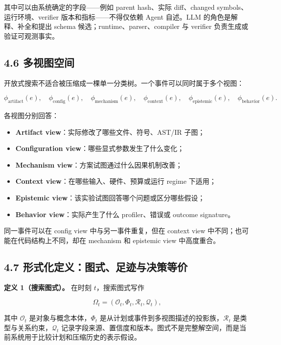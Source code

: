 \documentclass[
  11pt]{ctexart}
\providecommand{\tightlist}{%
  \setlength{\itemsep}{0pt}\setlength{\parskip}{0pt}}
\begin{document}
其中可以由系统确定的字段------例如 parent hash、实际 diff、changed
symbols、运行环境、verifier 版本和指标------不得仅依赖 Agent 自述。LLM
的角色是解释、补全和提出 schema 候选；runtime、parser、compiler 与
verifier 负责生成或验证可观测事实。

\subsection{4.6 多视图空间}\label{ux591aux89c6ux56feux7a7aux95f4}

开放式搜索不适合被压缩成一棵单一分类树。一个事件可以同时属于多个视图：

\[
\phi_{\text{artifact}}(e),\quad
\phi_{\text{config}}(e),\quad
\phi_{\text{mechanism}}(e),\quad
\phi_{\text{context}}(e),\quad
\phi_{\text{epistemic}}(e),\quad
\phi_{\text{behavior}}(e).
\]

各视图分别回答：

\begin{itemize}
\tightlist
\item
  \textbf{Artifact view}：实际修改了哪些文件、符号、AST/IR 子图；
\item
  \textbf{Configuration view}：哪些显式参数发生了什么变化；
\item
  \textbf{Mechanism view}：方案试图通过什么因果机制改善；
\item
  \textbf{Context view}：在哪些输入、硬件、预算或运行 regime 下适用；
\item
  \textbf{Epistemic view}：该实验试图回答哪个问题或区分哪些假设；
\item
  \textbf{Behavior view}：实际产生了什么 profiler、错误或 outcome
  signature。
\end{itemize}

同一事件可以在 config view 中与另一事件重复，但在 context view
中不同；也可能在代码结构上不同，却在 mechanism 和 epistemic view
中高度重合。

\subsection{4.7
形式化定义：图式、足迹与决策等价}\label{ux5f62ux5f0fux5316ux5b9aux4e49ux56feux5f0fux8db3ux8ff9ux4e0eux51b3ux7b56ux7b49ux4ef7}

\textbf{定义 1（搜索图式）。} 在时刻 \(t\)，搜索图式写作

\[
\Omega_t=(\mathcal{O}_t,\Phi_t,\mathcal{R}_t,\mathcal{Q}_t),
\]

其中 \(\mathcal{O}_t\) 是对象与概念本体，\(\Phi_t\)
是从计划或事件到多视图描述的投影族，\(\mathcal{R}_t\)
是类型与关系约束，\(\mathcal{Q}_t\)
记录字段来源、置信度和版本。图式不是完整解空间，而是当前系统用于比较计划和压缩历史的表示假设。
\end{document}
